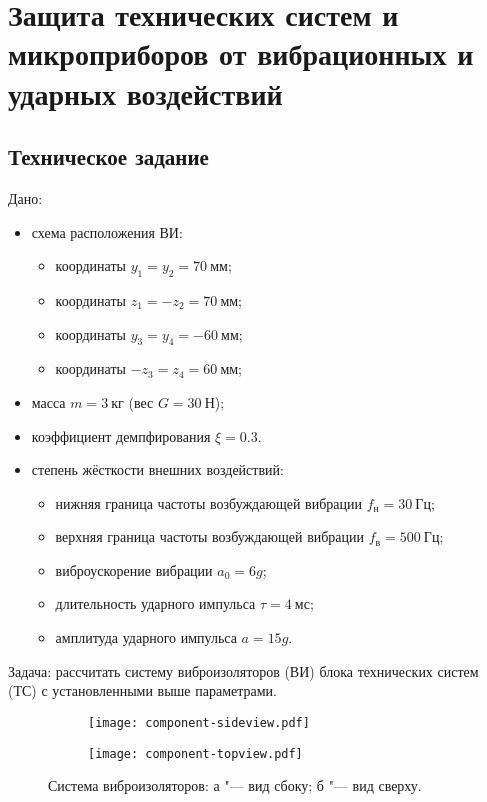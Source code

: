 \chapter{Защита технических систем и микроприборов от вибрационных и ударных воздействий}

\section{Техническое задание}

Дано:
\begin{itemize}
    \item схема расположения ВИ:
        \begin{itemize}
            \item координаты $y_1  = y_2  = 70~мм$;
            \item координаты $z_1  = -z_2 = 70~мм$;
            \item координаты $y_3  = y_4  = -60~мм$;
            \item координаты $-z_3 = z_4  = 60~мм$;
        \end{itemize}
    \item масса $m = 3~кг$ (вес $G = 30~Н$);
    \item коэффициент демпфирования $\xi = 0.3$.
    \item степень жёсткости внешних воздействий:
        \begin{itemize}
            \item нижняя граница частоты возбуждающей вибрации $f_{н} = 30~Гц$;
            \item верхняя граница частоты возбуждающей вибрации $f_{в} = 500~Гц$;
            \item виброускорение вибрации $a_0 = 6g$;
            \item длительность ударного импульса $\tau = 4~мс$;
            \item амплитуда ударного импульса $a = 15g$.
        \end{itemize}
\end{itemize}

Задача: рассчитать систему виброизоляторов (ВИ) блока технических систем (ТС) с установленными выше параметрами.

\begin{figure}[!h]
    \centering
    \begin{subfigure}[b]{0.45\textwidth}
        \centering
        \texttt{[image: component-sideview.pdf]}
        \caption{} 
        \label{fig:component-sideview}
    \end{subfigure}
    \begin{subfigure}[b]{0.45\textwidth}
        \centering
        \texttt{[image: component-topview.pdf]}
        \caption{}
        \label{fig:component-toview}
    \end{subfigure}
    \caption{Система виброизоляторов:
        а "--- вид сбоку;
        б "--- вид сверху.
    }
    \label{fig:component}
\end{figure}


